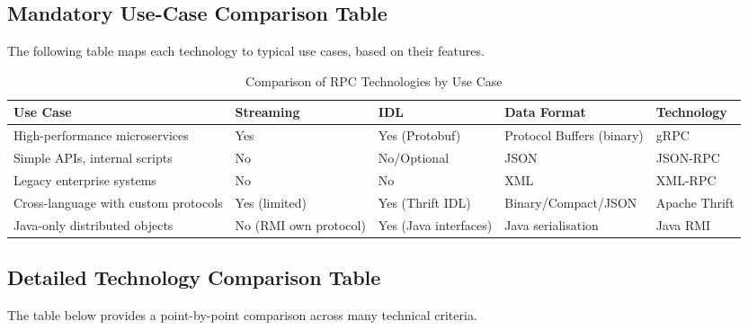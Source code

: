 \documentclass[a4paper]{article}
\begin{document}
\subsection{Mandatory Use-Case Comparison Table}
The following table maps each technology to typical use cases, based on their features.

\begin{table}[H]
\centering
\caption{Comparison of RPC Technologies by Use Case}
\label{tab:use_case}
\begin{tabular}{p{3.5cm}p{2.2cm}p{2.5cm}p{3cm}p{3cm}}
\toprule
\textbf{Use Case} & \textbf{Streaming} & \textbf{IDL} & \textbf{Data Format} & \textbf{Technology} \\
\midrule
High-performance microservices & Yes & Yes (Protobuf) & Protocol Buffers (binary) & gRPC \\
Simple APIs, internal scripts & No & No/Optional & JSON & JSON-RPC \\
Legacy enterprise systems & No & No & XML & XML-RPC \\
Cross-language with custom protocols & Yes (limited) & Yes (Thrift IDL) & Binary/Compact/JSON & Apache Thrift \\
Java-only distributed objects & No (RMI own protocol) & Yes (Java interfaces) & Java serialisation & Java RMI \\
\bottomrule
\end{tabular}
\end{table}

\subsection{Detailed Technology Comparison Table}
The table below provides a point-by-point comparison across many technical criteria.
\end{document}
